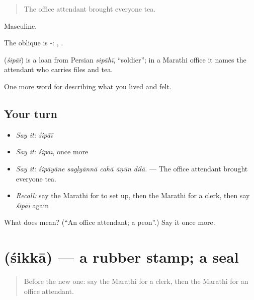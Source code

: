 \begin{quote}
The office attendant brought everyone tea.
\end{quote}

Masculine.

The oblique is -: , .

\begin{cousinweb}
\textbf{} (\emph{śipāī}) is a loan from Persian \emph{sipāhī}, \textquotedblleft{}soldier\textquotedblright{}; in a Marathi office it names the attendant who carries files and tea.
\end{cousinweb}

\begin{grammarlens}[title={What you've built}]
One more word for describing what you lived and felt.
\end{grammarlens}

\subsection*{Your turn}
\begin{itemize}
\raggedright
  \item \emph{Say it:} \emph{śipāī}
  \item \emph{Say it:} \emph{śipāī}, once more
  \item \emph{Say it:} \emph{śipāyāne sagḷyānnā cahā āṇūn dilā.} — The office attendant brought everyone tea.
  \item \emph{Recall:} say the Marathi for to set up, then the Marathi for a clerk, then say \emph{śipāī} again
\end{itemize}

\begin{tcolorbox}[breakable,colback=teal!4,colframe=teal!35!black,title={Before you move on}]
What does  mean? (\textquotedblleft{}An office attendant; a peon\textquotedblright{}.) Say it once more.
\end{tcolorbox}
\section[\texorpdfstring{\mr{शिक्का} (śikkā)}{शिक्का (śikkā)}]{ (śikkā) — a rubber stamp; a seal}

\label{lesson:MR-C506-sikka}



\begin{quote}
Before the new one: say the Marathi for a clerk, then the Marathi for an office attendant.
\end{quote}

